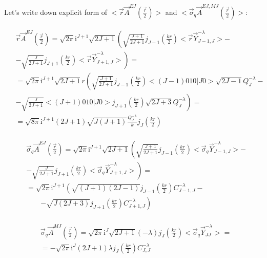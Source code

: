 Let's write down explicit form of $<\vec{r}\vec{A}^{EJ}(\frac{\vec{r}}{2})>$ and $<\vec{\sigma}_{q}\vec{A}^{EJ, MJ}(\frac{\vec{r}}{2})>$:

\begin{align}
    \begin{split}
        &\vec{r} \vec{A}^{EJ}(\frac{\vec{r}}{2}) = \sqrt{2\pi} \mathrm{i}^{J+1} \sqrt{2J+1} \left( \sqrt{\frac{J+1}{2J+1}} j_{J-1}(\frac{kr}{2})<\vec{r} \vec{Y}^{-\lambda}_{J-1, J}> - \right.\\
        &- \left. \sqrt{\frac{J}{2J+1}} j_{J+1}(\frac{kr}{2}) <\vec{r} \vec{Y}_{J+1, J}^{-\lambda}> \right) = \\
        &= \sqrt{2\pi} \mathrm{i}^{J+1} \sqrt{2J+1} r \left( \sqrt{\frac{J+1}{2J+1}} j_{J-1}(\frac{kr}{2}) <(J-1) 0 1 0 | J 0> \sqrt{2J-1} Q_{J}^{- \lambda} - \right.\\
        &- \left. \sqrt{\frac{J}{2J+1}} <(J+1) 0 1 0 | J 0> j_{J+1}(\frac{kr}{2}) \sqrt{2J+3} Q_{J}^{- \lambda} \right) = \\ 
    &= \sqrt{8\pi} \mathrm{i}^{J+1} (2J+1) \sqrt{J (J+1)}  \frac{Q_{J}^{- \lambda}}{k} j_J(\frac{k r}{2})
    \end{split}
\end{align}

\begin{align}
    \begin{split}
        &\vec{\sigma}_q \vec{A}^{EJ}(\frac{\vec{r}}{2}) = \sqrt{2\pi} \mathrm{i}^{J+1} \sqrt{2J+1} \left( \sqrt{\frac{J+1}{2J+1}} j_{J-1}(\frac{kr}{2})<\vec{\sigma}_q \vec{Y}^{- \lambda}_{J-1, J}> - \right.\\
        &\left. -\sqrt{\frac{J}{2J+1}} j_{J+1}(\frac{kr}{2}) <\vec{\sigma}_q \vec{Y}_{J+1, J}^{- \lambda}> \right) = \\
        &= \sqrt{2\pi} \mathrm{i}^{J+1} \left( \sqrt{(J+1)(2J-1)} j_{J-1}(\frac{kr}{2}) C_{J-1, J}^{- \lambda} - \right.\nonumber \\
        &\qquad \left.- \sqrt{J(2J+3)} j_{J+1}(\frac{kr}{2}) C_{J+1, J}^{- \lambda} \right)
    \end{split}
\end{align}

\begin{align}
    \begin{split}
        &\vec{\sigma}_q \vec{A}^{MJ}(\frac{\vec{r}}{2}) = \sqrt{2\pi }\mathrm{i}^J \sqrt{2J + 1} (- \lambda) j_J(\frac{kr}{2}) <\vec{\sigma}_q \vec{Y}^{- \lambda}_{JJ}> = \\
        &= -\sqrt{2\pi} \mathrm{i}^J (2J + 1) \lambda j_J(\frac{kr}{2}) C_{J, J}^{- \lambda}
    \end{split}
\end{align}

